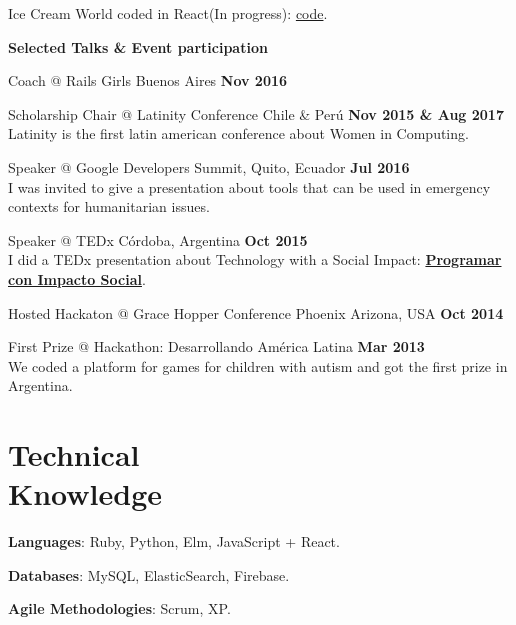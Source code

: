\documentclass[margin,line]{resume}
\begin{document}
\begin{resume}
\begin{list2}
\item Ice Cream World coded in React(In progress): \href{https://github.com/carohadad/icecream-world}{code}.
\end{list2}

\textbf{Selected Talks \& Event participation}

\begin{list2}
\item Coach  @ Rails Girls Buenos Aires \hfill \textbf{Nov 2016}

\item Scholarship Chair  @ Latinity Conference Chile \& Per\'u \hfill \textbf{Nov 2015 \& Aug 2017}\\
Latinity is the first latin american conference about Women in Computing.

\item Speaker @ Google Developers Summit, Quito, Ecuador \hfill \textbf{Jul 2016}  \\
I was invited to give a presentation about tools that can be used in emergency contexts for humanitarian issues.

\item Speaker @ TEDx C\'ordoba, Argentina \hfill \textbf{Oct 2015}  \\
I did a TEDx presentation about Technology with a Social Impact: \href{https://www.youtube.com/watch?v=0cx8UwdN-g4&t=1s}{\textbf{Programar con Impacto Social}}.

\item Hosted Hackaton @ Grace Hopper Conference Phoenix Arizona, USA \hfill \textbf{Oct 2014} 

\item First Prize @ Hackathon: Desarrollando Am\'erica Latina \hfill \textbf{Mar 2013} \\
We coded a platform for games for children with autism and got the first prize in Argentina.
\end{list2}


\section{\mysidestyle Technical\\Knowledge}


\textbf{Languages}: Ruby, Python, Elm, JavaScript + React. \vspace{-2mm}
    
\textbf{Databases}: MySQL, ElasticSearch, Firebase. \vspace{-2mm}
    
\textbf{Agile Methodologies}: Scrum, XP. \vspace{-2mm}
    

\end{resume}
\end{document}
